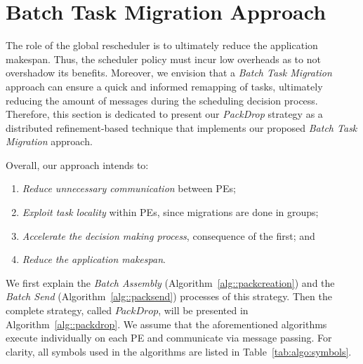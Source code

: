 \section{Batch Task Migration Approach} \label{sec:algo}



The role of the global rescheduler is to ultimately reduce the application makespan. 
Thus, the scheduler policy must incur low overheads as to not overshadow its benefits. 
Moreover, we envision that a \textit{Batch Task Migration} approach can ensure a quick and informed remapping of tasks, ultimately reducing the amount of messages during the scheduling decision process. 
Therefore, this section is dedicated to present our \textit{PackDrop} strategy as a distributed refinement-based technique that implements our proposed \textit{Batch Task Migration} approach.

Overall, our approach intends to:

\begin{enumerate}
	\item \textit{Reduce unnecessary communication} between PEs;
	\item \textit{Exploit task locality} within PEs, since migrations are done in groups;
	\item \textit{Accelerate the decision making process}, consequence of the first; and
	\item \textit{Reduce the application makespan}.
\end{enumerate}

We first explain the \textit{Batch Assembly} (Algorithm~\ref{alg::packcreation}) and the \textit{Batch Send} (Algorithm~\ref{alg::packsend}) processes of this strategy.
Then the complete strategy, called $PackDrop$, will be presented in Algorithm~\ref{alg::packdrop}.
We assume that the aforementioned algorithms execute individually on each PE and communicate via message passing.
For clarity, all symbols used in the algorithms are listed in Table~\ref{tab:algo:symbols}.

